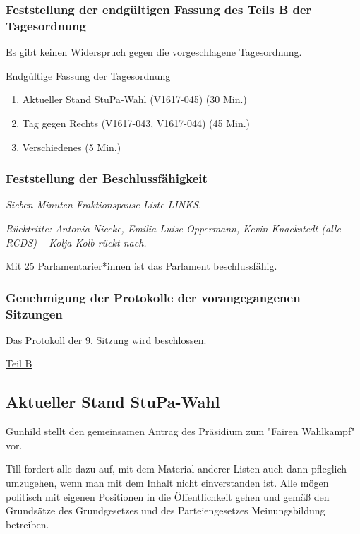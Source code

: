 \documentclass[ngerman,headheight=70pt]{scrartcl}
\begin{document}
    \subsubsection{Feststellung der endgültigen Fassung des Teils B der Tagesordnung}

    Es gibt keinen Widerspruch gegen die vorgeschlagene Tagesordnung.

    \newpage
    \underline{Endgültige Fassung der Tagesordnung}
    \begin{enumerate}[label={\textbf{Top \theenumi}},leftmargin=*]
        \item Aktueller Stand StuPa-Wahl (V1617-045) (30 Min.)
        \item Tag gegen Rechts (V1617-043, V1617-044) (45 Min.)
        \item Verschiedenes (5 Min.)
    \end{enumerate}

    \subsubsection{Feststellung der Beschlussfähigkeit}

    \textit{Sieben Minuten Fraktionspause Liste LINKS.}

    \textit{Rücktritte: Antonia Niecke, Emilia Luise Oppermann, Kevin Knackstedt (alle
    RCDS) – Kolja Kolb rückt nach.}

    Mit 25 Parlamentarier*innen ist das Parlament beschlussfähig.


    \subsubsection{Genehmigung der Protokolle der vorangegangenen Sitzungen}

    Das Protokoll der 9. Sitzung wird beschlossen.

    \vspace{0.5cm}
    {\Large \underline{Teil B}}

    \subsection{Aktueller Stand StuPa-Wahl}

    Gunhild stellt den gemeinsamen Antrag des Präsidium zum "Fairen Wahlkampf"
    vor.

    Till fordert alle dazu auf, mit dem Material anderer Listen auch dann pfleglich
    umzugehen, wenn man mit dem Inhalt nicht einverstanden ist. Alle mögen
    politisch mit eigenen Positionen in die Öffentlichkeit gehen und gemäß den
    Grundsätze des Grundgesetzes und des Parteiengesetzes Meinungsbildung
    betreiben.
\end{document}
